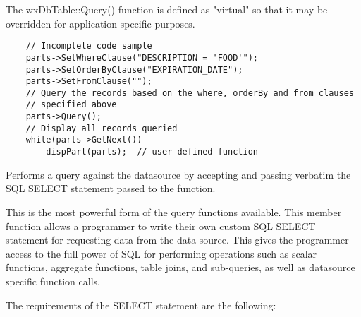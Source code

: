 The wxDbTable::Query() function is defined as "virtual" so that it may be 
overridden for application specific purposes.



\begin{verbatim}
    // Incomplete code sample
    parts->SetWhereClause("DESCRIPTION = 'FOOD'");
    parts->SetOrderByClause("EXPIRATION_DATE");
    parts->SetFromClause("");
    // Query the records based on the where, orderBy and from clauses 
    // specified above
    parts->Query();
    // Display all records queried
    while(parts->GetNext())
        dispPart(parts);  // user defined function
\end{verbatim}


\label{wxdbtablequerybysqlstmt}


Performs a query against the datasource by accepting and passing verbatim the 
SQL SELECT statement passed to the function.




This is the most powerful form of the query functions available.  This member 
function allows a programmer to write their own custom SQL SELECT statement 
for requesting data from the data source.  This gives the programmer access 
to the full power of SQL for performing operations such as scalar functions, 
aggregate functions, table joins, and sub-queries, as well as datasource 
specific function calls.  

The requirements of the SELECT statement are the following:

